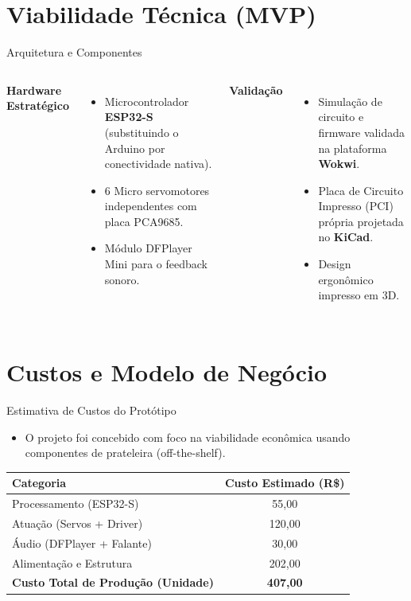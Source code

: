 \documentclass[aspectratio=169]{beamer} %
\begin{document}
\section{Viabilidade Técnica (MVP)}
\begin{frame}{Arquitetura e Componentes}
  \begin{columns}
    \textbf{Hardware Estratégico}
    \begin{itemize}
      \item Microcontrolador \textbf{ESP32-S} (substituindo o Arduino por conectividade nativa).
      \item 6 Micro servomotores independentes com placa PCA9685.
      \item Módulo DFPlayer Mini para o feedback sonoro.
    \end{itemize}
    
    \textbf{Validação}
    \begin{itemize}
      \item Simulação de circuito e firmware validada na plataforma \textbf{Wokwi}.
      \item Placa de Circuito Impresso (PCI) própria projetada no \textbf{KiCad}.
      \item Design ergonômico impresso em 3D.
    \end{itemize}
  \end{columns}
\end{frame}

\section{Custos e Modelo de Negócio}
\begin{frame}{Estimativa de Custos do Protótipo}
  \begin{itemize}
    \item O projeto foi concebido com foco na viabilidade econômica usando componentes de prateleira (off-the-shelf).
  \end{itemize}
  
  \vspace{0.5cm}
  \begin{table}[]
      \centering
      \begin{tabular}{lc}
           \toprule
           \textbf{Categoria} & \textbf{Custo Estimado (R\$)} \\
           \midrule
           Processamento (ESP32-S) & 55,00 \\
           Atuação (Servos + Driver) & 120,00 \\
           Áudio (DFPlayer + Falante) & 30,00 \\
           Alimentação e Estrutura & 202,00 \\
           \midrule
           \textbf{Custo Total de Produção (Unidade)} & \textbf{407,00} \\
           \bottomrule
      \end{tabular}
  \end{table}
\end{frame}
\end{document}
